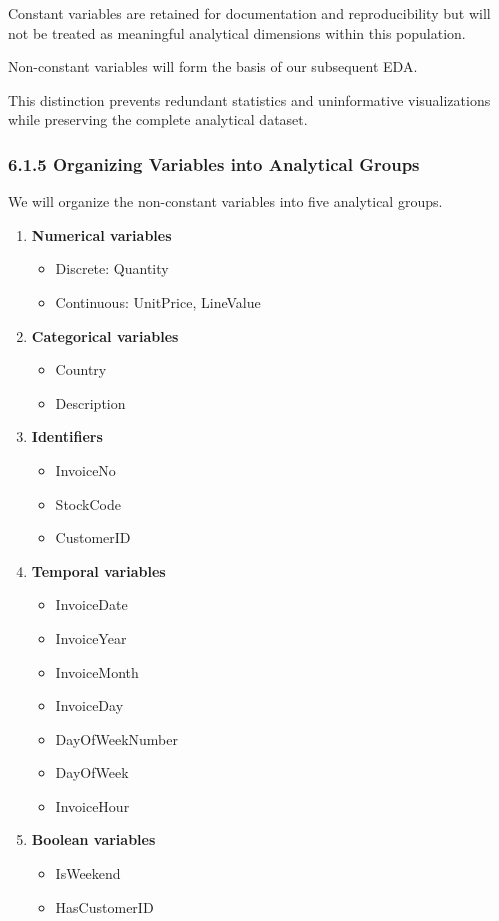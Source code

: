 \documentclass[11pt]{article}
\providecommand{\tightlist}{%
      \setlength{\itemsep}{0pt}\setlength{\parskip}{0pt}}
\begin{document}
Constant variables are retained for documentation and reproducibility
but will not be treated as meaningful analytical dimensions within this
population.

Non-constant variables will form the basis of our subsequent EDA.

This distinction prevents redundant statistics and uninformative
visualizations while preserving the complete analytical dataset.

    \subsubsection{6.1.5 Organizing Variables into Analytical
Groups}\label{organizing-variables-into-analytical-groups}

We will organize the non-constant variables into five analytical groups.

\begin{enumerate}
\def\labelenumi{\arabic{enumi}.}
\tightlist
\item
  \textbf{Numerical variables}

  \begin{itemize}
  \tightlist
  \item
    Discrete: Quantity
  \item
    Continuous: UnitPrice, LineValue
  \end{itemize}
\item
  \textbf{Categorical variables}

  \begin{itemize}
  \tightlist
  \item
    Country
  \item
    Description
  \end{itemize}
\item
  \textbf{Identifiers}

  \begin{itemize}
  \tightlist
  \item
    InvoiceNo
  \item
    StockCode
  \item
    CustomerID
  \end{itemize}
\item
  \textbf{Temporal variables}

  \begin{itemize}
  \tightlist
  \item
    InvoiceDate
  \item
    InvoiceYear
  \item
    InvoiceMonth
  \item
    InvoiceDay
  \item
    DayOfWeekNumber
  \item
    DayOfWeek
  \item
    InvoiceHour
  \end{itemize}
\item
  \textbf{Boolean variables}

  \begin{itemize}
  \tightlist
  \item
    IsWeekend
  \item
    HasCustomerID
  \end{itemize}
\end{enumerate}
\end{document}

